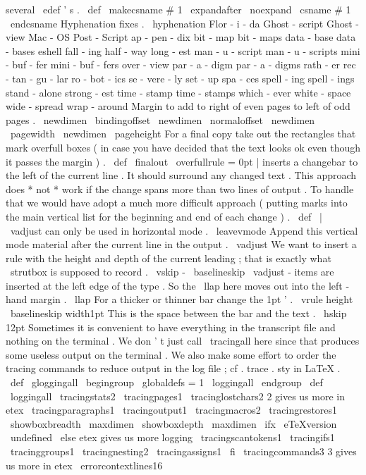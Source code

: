 several
\
edef
'
s
.
\
def
\
makecsname
#
1
{
\
expandafter
\
noexpand
\
csname
#
1
\
endcsname
}
%
Hyphenation
fixes
.
\
hyphenation
{
Flor
-
i
-
da
Ghost
-
script
Ghost
-
view
Mac
-
OS
Post
-
Script
ap
-
pen
-
dix
bit
-
map
bit
-
maps
data
-
base
data
-
bases
eshell
fall
-
ing
half
-
way
long
-
est
man
-
u
-
script
man
-
u
-
scripts
mini
-
buf
-
fer
mini
-
buf
-
fers
over
-
view
par
-
a
-
digm
par
-
a
-
digms
rath
-
er
rec
-
tan
-
gu
-
lar
ro
-
bot
-
ics
se
-
vere
-
ly
set
-
up
spa
-
ces
spell
-
ing
spell
-
ings
stand
-
alone
strong
-
est
time
-
stamp
time
-
stamps
which
-
ever
white
-
space
wide
-
spread
wrap
-
around
}
%
Margin
to
add
to
right
of
even
pages
to
left
of
odd
pages
.
\
newdimen
\
bindingoffset
\
newdimen
\
normaloffset
\
newdimen
\
pagewidth
\
newdimen
\
pageheight
%
For
a
final
copy
take
out
the
rectangles
%
that
mark
overfull
boxes
(
in
case
you
have
decided
%
that
the
text
looks
ok
even
though
it
passes
the
margin
)
.
%
\
def
\
finalout
{
\
overfullrule
=
0pt
}
%
|
inserts
a
changebar
to
the
left
of
the
current
line
.
It
should
%
surround
any
changed
text
.
This
approach
does
*
not
*
work
if
the
%
change
spans
more
than
two
lines
of
output
.
To
handle
that
we
would
%
have
adopt
a
much
more
difficult
approach
(
putting
marks
into
the
main
%
vertical
list
for
the
beginning
and
end
of
each
change
)
.
%
\
def
\
|
{
%
%
\
vadjust
can
only
be
used
in
horizontal
mode
.
\
leavevmode
%
%
Append
this
vertical
mode
material
after
the
current
line
in
the
output
.
\
vadjust
{
%
%
We
want
to
insert
a
rule
with
the
height
and
depth
of
the
current
%
leading
;
that
is
exactly
what
\
strutbox
is
supposed
to
record
.
\
vskip
-
\
baselineskip
%
%
\
vadjust
-
items
are
inserted
at
the
left
edge
of
the
type
.
So
%
the
\
llap
here
moves
out
into
the
left
-
hand
margin
.
\
llap
{
%
%
%
For
a
thicker
or
thinner
bar
change
the
1pt
'
.
\
vrule
height
\
baselineskip
width1pt
%
%
This
is
the
space
between
the
bar
and
the
text
.
\
hskip
12pt
}
%
}
%
}
%
Sometimes
it
is
convenient
to
have
everything
in
the
transcript
file
%
and
nothing
on
the
terminal
.
We
don
'
t
just
call
\
tracingall
here
%
since
that
produces
some
useless
output
on
the
terminal
.
We
also
make
%
some
effort
to
order
the
tracing
commands
to
reduce
output
in
the
log
%
file
;
cf
.
trace
.
sty
in
LaTeX
.
%
\
def
\
gloggingall
{
\
begingroup
\
globaldefs
=
1
\
loggingall
\
endgroup
}
%
\
def
\
loggingall
{
%
\
tracingstats2
\
tracingpages1
\
tracinglostchars2
%
2
gives
us
more
in
etex
\
tracingparagraphs1
\
tracingoutput1
\
tracingmacros2
\
tracingrestores1
\
showboxbreadth
\
maxdimen
\
showboxdepth
\
maxdimen
\
ifx
\
eTeXversion
\
undefined
\
else
%
etex
gives
us
more
logging
\
tracingscantokens1
\
tracingifs1
\
tracinggroups1
\
tracingnesting2
\
tracingassigns1
\
fi
\
tracingcommands3
%
3
gives
us
more
in
etex
\
errorcontextlines16
}
